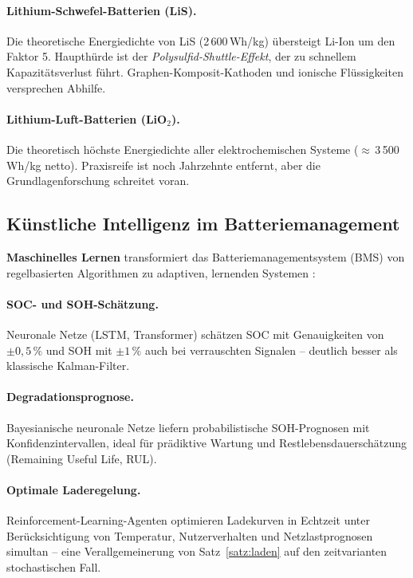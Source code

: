 ﻿\documentclass[a4paper,12pt]{article}
\theoremstyle{definition}
\begin{document}
\paragraph{Lithium-Schwefel-Batterien (LiS).}
Die theoretische Energiedichte von LiS (2\,600\,Wh/kg) \"ubersteigt Li-Ion
um den Faktor 5. Haupthürde ist der \emph{Polysulfid-Shuttle-Effekt},
der zu schnellem Kapazit\"atsverlust f\"uhrt. Graphen-Komposit-Kathoden
und ionische Fl\"ussigkeiten versprechen Abhilfe.

\paragraph{Lithium-Luft-Batterien (LiO$_2$).}
Die theoretisch h\"ochste Energiedichte aller elektrochemischen Systeme
($\approx$\,3\,500\,Wh/kg netto). Praxisreife ist noch Jahrzehnte entfernt,
aber die Grundlagenforschung schreitet voran.

\subsection{K\"unstliche Intelligenz im Batteriemanagement}

\textbf{Maschinelles Lernen} transformiert das Batteriemanagementsystem (BMS)
von regelbasierten Algorithmen zu adaptiven, lernenden Systemen \cite{Liu2019}:

\paragraph{SOC- und SOH-Sch\"atzung.}
Neuronale Netze (LSTM, Transformer) sch\"atzen SOC mit Genauigkeiten von
$\pm 0{,}5\,\%$ und SOH mit $\pm 1\,\%$ auch bei verrauschten Signalen --
deutlich besser als klassische Kalman-Filter.

\paragraph{Degradationsprognose.}
Bayesianische neuronale Netze liefern probabilistische SOH-Prognosen
mit Konfidenzintervallen, ideal f\"ur pr\"adiktive Wartung und
Restlebensdauersch\"atzung (Remaining Useful Life, RUL).

\paragraph{Optimale Laderegelung.}
Reinforcement-Learning-Agenten optimieren Ladekurven in Echtzeit unter
Ber\"ucksichtigung von Temperatur, Nutzerverhalten und Netzlastprognosen
simultan -- eine Verallgemeinerung von Satz~\ref{satz:laden} auf den
zeitvarianten stochastischen Fall.
\end{document}
